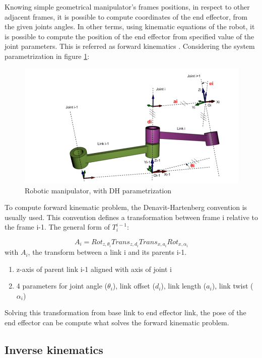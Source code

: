 Knowing simple geometrical manipulator’s frames positions, in respect to other adjacent frames, it is possible to compute coordinates of the end effector, from the given joints angles. In other terms, using kinematic equations of the robot, it is possible to compute the position of the end effector from specified value of the joint parameters. This is referred as forward kinematics \cite{trove.nla.gov.au/work/27361264}.
Considering the system parametrization in figure \ref{pict:dh}:

\begin{figure} [!ht]
    \centering
    \includegraphics[width=0.45\linewidth]{images/dh.png}
    \caption{Robotic manipulator, with DH parametrization}
    \label{pict:dh}
\end{figure}
\newpage
To compute forward kinematic problem, the Denavit-Hartenberg convention is usually used. This convention defines a transformation between frame {i} relative to the frame {i-1}. The general form of $T_i^{i-1}$:

\begin{equation}
    A_i = Rot_{z,\theta _i} Trans_{z,d_i} Trans_{x,a_i} Rot_{x, \alpha _i}
\end{equation}
with $A_i$, the transform between a link i and its parents i-1.
\begin{enumerate}
    \item z-axis of parent link i-1 aligned with axis of joint i
    \item 4 parameters for joint angle ($\theta _i$), link offset ($d_i$), link length ($a_i$), link twist ($\alpha _i$)
\end{enumerate}
Solving this transformation from base link to end effector link, the pose of the end effector can be compute what solves the forward kinematic problem. 

\subsection{Inverse kinematics}

